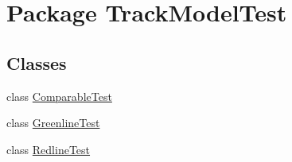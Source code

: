 \hypertarget{namespaceTrackModelTest}{}\section{Package Track\+Model\+Test}
\label{namespaceTrackModelTest}
\subsection*{Classes}
\begin{DoxyCompactItemize}
\item 
class \hyperlink{classTrackModelTest_1_1ComparableTest}{Comparable\+Test}
\item 
class \hyperlink{classTrackModelTest_1_1GreenlineTest}{Greenline\+Test}
\item 
class \hyperlink{classTrackModelTest_1_1RedlineTest}{Redline\+Test}
\end{DoxyCompactItemize}
